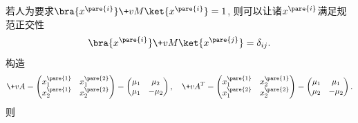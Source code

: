 \documentclass[../LectureNotes.tex]{subfiles}
\begin{document}
若人为要求$\bra{x^{\pare{i}}}\+vM \ket{x^{\pare{i}}} = 1$, 则可以让诸$x^{\pare{i}}$满足规范正交性
\[ \bra{x^{\pare{i}}}\+vM \ket{x^{\pare{j}}} = \delta_{ij}. \]
构造
\[ \+vA = \begin{pmatrix}
    x_1^{\pare{1}} & x_1^{\pare{2}} \\
    x_2^{\pare{1}} & x_2^{\pare{2}}
\end{pmatrix} = \begin{pmatrix}
    \mu_1 & \mu_2 \\
    \mu_1 & -\mu_2
\end{pmatrix},\quad \+vA^T = \begin{pmatrix}
    x_1^{\pare{1}} & x_2^{\pare{1}} \\
    x_1^{\pare{2}} & x_2^{\pare{2}}
\end{pmatrix} = \begin{pmatrix}
    \mu_1 & \mu_1 \\
    \mu_2 & -\mu_2
\end{pmatrix}. \]
则
\end{document}
